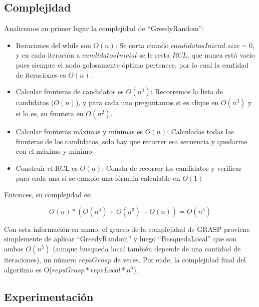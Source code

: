 \subsection{Complejidad}

Analicemos en primer lugar la complejidad de ``GreedyRandom'':
\begin{itemize}
    \item Iteraciones del while son $O(n)$: Se corta cuando $candidatosInicial.size = 0$, y en cada iteración a $candidatosInicial$ se le resta $RCL$, que nunca está vacio pues siempre el nodo golosamente óptimo pertenece, por lo cual la cantidad de iteraciones es $O(n)$.
    \item Calcular fronteras de candidatos es $O(n^4)$: Recorremos la lista de candidatos ($O(n)$), y para cada uno preguntamos si es clique en $O(n^3)$ y si lo es, su frontera en $O(n^2)$.
    \item Calcular fronteras máximas y mínimas es $O(n)$: Calculadas todas las fronteras de los candidatos, solo hay que recorrer esa secuencia y quedarme con el máximo y mínimo
    \item Construir el RCL es $O(n)$: Consta de recorrer los candidatos y verificar para cada una si se cumple una fórmula calculable en $O(1)$
\end{itemize}

Entonces, su complejidad es:

$$ O(n) * (O(n^4) + O(n^3) + O(n)) = O(n^5)$$

Con esta información en mano, el grueso de la complejidad de GRASP proviene simplemente de aplicar ``GreedyRandom'' y luego ``BusquedaLocal'' que son ambas $O(n^5)$ (aunque busqueda local también depende de una cantidad de iteraciones), un número $repsGrasp$ de veces. Por ende, la complejidad final del algoritmo es O($repsGrasp * repsLocal * n^5$).


\subsection{Experimentación}

